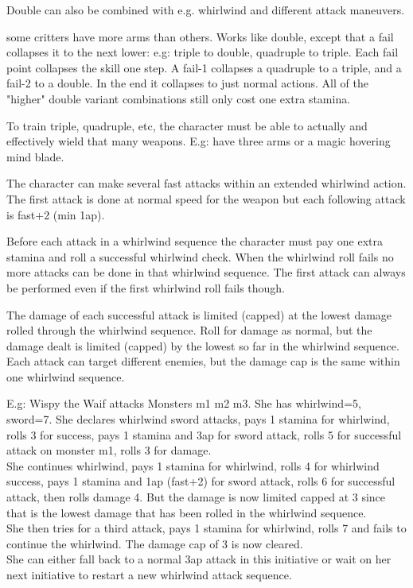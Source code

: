 Double can also be combined with e.g. whirlwind and different attack maneuvers.


 some critters have more arms than others. Works like double, except that a fail collapses it to the next lower: e.g: triple to double, quadruple to triple. Each fail point collapses the skill one step. A fail-1 collapses a quadruple to a triple, and a fail-2 to a double. In the end it collapses to just normal actions. All of the "higher" double variant combinations still only cost one extra stamina.

To train triple, quadruple, etc, the character must be able to actually and effectively wield that many weapons. E.g: have three arms or a magic hovering mind blade.


 The character can make several fast attacks within an extended whirlwind action. The first attack is done at normal speed for the weapon but each following attack is fast+2 (min 1ap).

Before each attack in a whirlwind sequence the character must pay one extra stamina and roll a successful whirlwind check. When the whirlwind roll fails no more attacks can be done in that whirlwind sequence. The first attack can always be performed even if the first whirlwind roll fails though.

The damage of each successful attack is limited (capped) at the lowest damage rolled through the whirlwind sequence. Roll for damage as normal, but the damage dealt is limited (capped) by the lowest so far in the whirlwind sequence. Each attack can target different enemies, but the damage cap is the same within one whirlwind sequence.

E.g: Wispy the Waif attacks Monsters m1 m2 m3. She has whirlwind=5, sword=7.
She declares whirlwind sword attacks, 
pays 1 stamina for whirlwind, rolls 3 for success, pays 1 stamina and 3ap for sword attack, rolls 5 for successful attack on monster m1, rolls 3 for damage. \\
She continues whirlwind, pays 1 stamina for whirlwind, rolls 4 for whirlwind success, pays 1 stamina and 1ap (fast+2) for sword attack, rolls 6 for successful attack, then rolls damage 4. But the damage is now limited capped at 3 since that is the lowest damage that has been rolled in the whirlwind sequence. \\
She then tries for a third attack, pays 1 stamina for whirlwind, rolls 7 and fails to continue the whirlwind. The damage cap of 3 is now cleared. \\
She can either fall back to a normal 3ap attack in this initiative or wait on her next initiative to restart a new whirlwind attack sequence.

